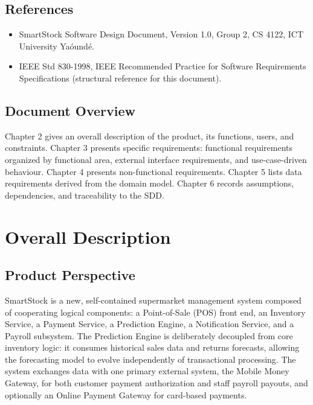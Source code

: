\documentclass[11pt,a4paper]{report}
\begin{document}
\section{References}
\begin{itemize}
    \item SmartStock Software Design Document, Version 1.0, Group 2, CS 4122, ICT University Ya\'ound\'e.
    \item IEEE Std 830-1998, IEEE Recommended Practice for Software Requirements Specifications (structural reference for this document).
\end{itemize}

\section{Document Overview}
Chapter 2 gives an overall description of the product, its functions, users, and constraints. Chapter 3 presents specific requirements: functional requirements organized by functional area, external interface requirements, and use-case-driven behaviour. Chapter 4 presents non-functional requirements. Chapter 5 lists data requirements derived from the domain model. Chapter 6 records assumptions, dependencies, and traceability to the SDD.

\chapter{Overall Description}

\section{Product Perspective}
SmartStock is a new, self-contained supermarket management system composed of cooperating logical components: a Point-of-Sale (POS) front end, an Inventory Service, a Payment Service, a Prediction Engine, a Notification Service, and a Payroll subsystem. The Prediction Engine is deliberately decoupled from core inventory logic: it consumes historical sales data and returns forecasts, allowing the forecasting model to evolve independently of transactional processing. The system exchanges data with one primary external system, the Mobile Money Gateway, for both customer payment authorization and staff payroll payouts, and optionally an Online Payment Gateway for card-based payments.
\end{document}
